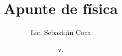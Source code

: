 %



%



\newcommand{\finej}{\hspace*{\fill}$\blacklozenge$}

\hyphenation{
	}

\setcounter{tocdepth}{3}

\title{Apunte de física}
\author{Lic. Sebastián Coca}
\def\autor{Sebastián Coca}
\def\titulo{Apunte de física}
\def\subtitulo{Mecánica}
\def\version{v.\number\year\number\month\number\day}
\date{\small v.\number\year\number\month\number\day}

